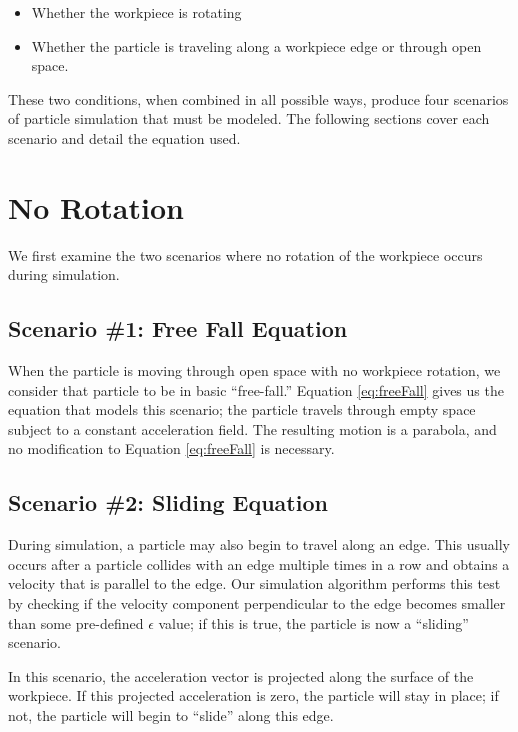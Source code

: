 \begin{itemize}
	\item Whether the workpiece is rotating
	\item Whether the particle is traveling along a workpiece edge or through open space.
\end{itemize}

These two conditions, when combined in all possible ways, produce four scenarios of particle simulation that must be modeled. The following sections cover each scenario and detail the equation used.


\section{No Rotation}

We first examine the two scenarios where no rotation of the workpiece occurs during simulation.

		\subsection{Scenario \#1: Free Fall Equation}

When the particle is moving through open space with no workpiece rotation, we consider that particle to be in basic ``free-fall.'' Equation \eqref{eq:freeFall} gives us the equation that models this scenario; the particle travels through empty space subject to a constant acceleration field. The resulting motion is a parabola, and no modification to Equation \eqref{eq:freeFall} is necessary.


		\subsection{Scenario \#2: Sliding Equation}

During simulation, a particle may also begin to travel along an edge. This usually occurs after a particle collides with an edge multiple times in a row and obtains a velocity that is parallel to the edge. Our simulation algorithm performs this test by checking if the velocity component perpendicular to the edge becomes smaller than some pre-defined $\epsilon$ value; if this is true, the particle is now a ``sliding'' scenario.

In this scenario, the acceleration vector is projected along the surface of the workpiece. If this projected acceleration is zero, the particle will stay in place; if not, the particle will begin to ``slide'' along this edge.

